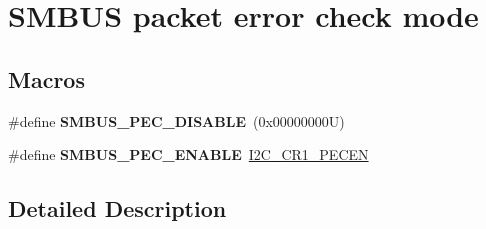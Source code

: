 \hypertarget{group___s_m_b_u_s__packet__error__check__mode}{}\section{S\+M\+B\+US packet error check mode}
\label{group___s_m_b_u_s__packet__error__check__mode}
\subsection*{Macros}
\begin{DoxyCompactItemize}
\item 
\mbox{\label{group___s_m_b_u_s__packet__error__check__mode_ga48763a687d52af10216b13d8308d97f6}} 
\#define {\bfseries S\+M\+B\+U\+S\+\_\+\+P\+E\+C\+\_\+\+D\+I\+S\+A\+B\+LE}~(0x00000000\+U)
\item 
\mbox{\label{group___s_m_b_u_s__packet__error__check__mode_ga524481f0ca813a49fed450c5210154b1}} 
\#define {\bfseries S\+M\+B\+U\+S\+\_\+\+P\+E\+C\+\_\+\+E\+N\+A\+B\+LE}~\hyperlink{group___peripheral___registers___bits___definition_ga393649f17391feae45fa0db955b3fdf5}{I2\+C\+\_\+\+C\+R1\+\_\+\+P\+E\+C\+EN}
\end{DoxyCompactItemize}


\subsection{Detailed Description}
